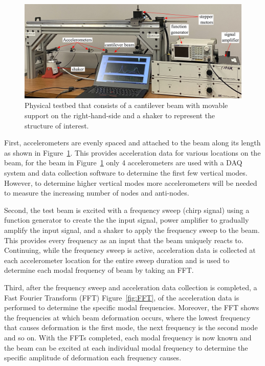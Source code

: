 \documentclass[12pt,letter]{article}
\numberwithin{ex}{section} %
\numberwithin{re}{section} %
\begin{document}
\begin{figure}[H]
	\centering 
	\includegraphics*[width= 1\linewidth]{figures/Testbed/PhysicalTestbed.png}
	\caption{Physical testbed that consists of a cantilever beam with movable support on the right-hand-side and a shaker to represent the structure of interest.}
	\label{fig:PhysicalTestBed}
\end{figure}


First, accelerometers are evenly spaced and attached to the beam along its length as shown in Figure~\ref{fig:PhysicalTestBed}. This provides acceleration data for various locations on the beam, for the beam in Figure~\ref{fig:PhysicalTestBed} only 4 accelerometers are used with a DAQ system and data collection software to determine the first few vertical modes. However, to determine higher vertical modes more accelerometers will be needed to measure the increasing number of nodes and anti-nodes.    




Second, the test beam is excited with a frequency sweep (chirp signal) using a function generator to create the the input signal, power amplifier to gradually amplify the input signal, and a shaker to apply the frequency sweep to the beam. This provides every frequency as an input that the beam uniquely reacts to. Continuing, while the frequency sweep is active, acceleration data is collected at each accelerometer location for the entire sweep duration and is used to determine each modal frequency of beam by taking an FFT.


Third, after the frequency sweep and acceleration data collection is completed, a Fast Fourier Transform (FFT) Figure~\ref{fig:FFT}, of the acceleration data is performed to determine the specific modal frequencies. Moreover, the FFT shows the frequencies at which beam deformation occurs, where the lowest frequency that causes deformation is the first mode, the next frequency is the second mode and so on. With the FFTs completed, each modal frequency is now known and the beam can be excited at each individual modal frequency to determine the specific amplitude of deformation each frequency causes. 
\end{document}
